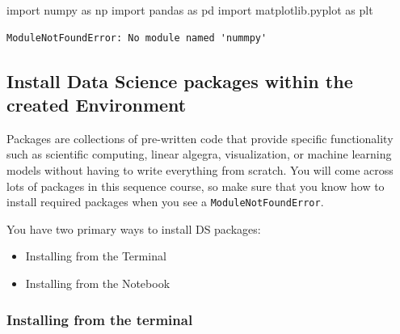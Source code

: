 \documentclass[
  letterpaper,
  DIV=11,
  numbers=noendperiod]{scrreprt}
\newenvironment{Shaded}{\begin{snugshade}}{\end{snugshade}}
\newcommand{\ImportTok}[1]{\textcolor[rgb]{0.00,0.46,0.62}{#1}}
\newcommand{\NormalTok}[1]{\textcolor[rgb]{0.00,0.23,0.31}{#1}}
\providecommand{\tightlist}{%
  \setlength{\itemsep}{0pt}\setlength{\parskip}{0pt}}\usepackage{longtable,booktabs,array}
\begin{document}
\begin{Shaded}
\begin{Highlighting}[]
\ImportTok{import}\NormalTok{ numpy }\ImportTok{as}\NormalTok{ np}
\ImportTok{import}\NormalTok{ pandas }\ImportTok{as}\NormalTok{ pd}
\ImportTok{import}\NormalTok{ matplotlib.pyplot }\ImportTok{as}\NormalTok{ plt}
\end{Highlighting}
\end{Shaded}

\begin{verbatim}
ModuleNotFoundError: No module named 'nummpy'
\end{verbatim}

\hypertarget{install-data-science-packages-within-the-created-environment}{%
\subsection{Install Data Science packages within the created
Environment}\label{install-data-science-packages-within-the-created-environment}}

Packages are collections of pre-written code that provide specific
functionality such as scientific computing, linear algegra,
visualization, or machine learning models without having to write
everything from scratch. You will come across lots of packages in this
sequence course, so make sure that you know how to install required
packages when you see a \texttt{ModuleNotFoundError}.

You have two primary ways to install DS packages:

\begin{itemize}
\tightlist
\item
  Installing from the Terminal
\item
  Installing from the Notebook
\end{itemize}

\hypertarget{installing-from-the-terminal}{%
\subsubsection{Installing from the
terminal}\label{installing-from-the-terminal}}
\end{document}
